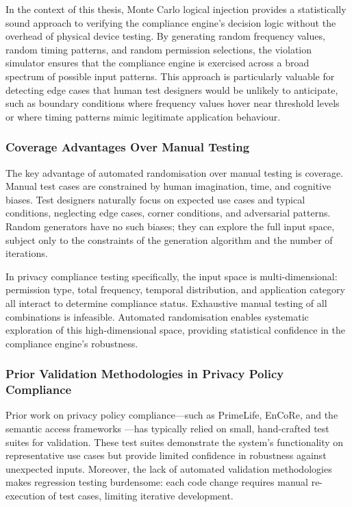 In the context of this thesis, Monte Carlo logical injection provides a statistically sound approach to verifying the compliance engine's decision logic without the overhead of physical device testing. By generating random frequency values, random timing patterns, and random permission selections, the violation simulator ensures that the compliance engine is exercised across a broad spectrum of possible input patterns. This approach is particularly valuable for detecting edge cases that human test designers would be unlikely to anticipate, such as boundary conditions where frequency values hover near threshold levels or where timing patterns mimic legitimate application behaviour.

\subsubsection{Coverage Advantages Over Manual Testing}
The key advantage of automated randomisation over manual testing is coverage. Manual test cases are constrained by human imagination, time, and cognitive biases. Test designers naturally focus on expected use cases and typical conditions, neglecting edge cases, corner conditions, and adversarial patterns. Random generators have no such biases; they can explore the full input space, subject only to the constraints of the generation algorithm and the number of iterations.

In privacy compliance testing specifically, the input space is multi-dimensional: permission type, total frequency, temporal distribution, and application category all interact to determine compliance status. Exhaustive manual testing of all combinations is infeasible. Automated randomisation enables systematic exploration of this high-dimensional space, providing statistical confidence in the compliance engine's robustness.

\subsubsection{Prior Validation Methodologies in Privacy Policy Compliance}
Prior work on privacy policy compliance—such as PrimeLife, EnCoRe, and the semantic access frameworks \cite{17}—has typically relied on small, hand-crafted test suites for validation. These test suites demonstrate the system's functionality on representative use cases but provide limited confidence in robustness against unexpected inputs. Moreover, the lack of automated validation methodologies makes regression testing burdensome: each code change requires manual re-execution of test cases, limiting iterative development.

